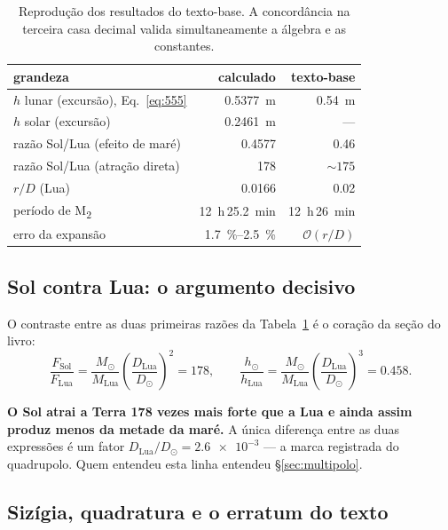 \documentclass[11pt,a4paper,oneside]{report}
\theoremstyle{definition}
\theoremstyle{plain}
\theoremstyle{remark}
\newcommand{\ordem}[1]{\mathcal{O}\!\left(#1\right)}
\begin{document}
\begin{table}[htbp]
\centering
\caption{Reprodução dos resultados do texto-base. A concordância na terceira
casa decimal valida simultaneamente a álgebra e as constantes.}
\label{tab:numeros}
\begin{tabular}{@{}lrr@{}}
\toprule
grandeza & calculado & texto-base \\
\midrule
$h$ lunar (excursão), Eq.~\eqref{eq:555} & \SI{0.5377}{\meter} & \SI{0.54}{\meter} \\
$h$ solar (excursão) & \SI{0.2461}{\meter} & --- \\
razão Sol/Lua (efeito de maré) & \num{0.4577} & \num{0.46} \\
razão Sol/Lua (atração direta) & \num{178} & $\sim\!\num{175}$ \\
$r/D$ (Lua) & \num{0.0166} & \num{0.02} \\
período de M\textsubscript{2} & \SI{12}{\hour}\,\SI{25.2}{\minute} & \SI{12}{\hour}\,\SI{26}{\minute} \\
erro da expansão & \SIrange{1.7}{2.5}{\percent} & $\ordem{r/D}$ \\
\bottomrule
\end{tabular}
\end{table}

\subsection{Sol contra Lua: o argumento decisivo}
\label{sec:solvslua}

O contraste entre as duas primeiras razões da Tabela~\ref{tab:numeros} é o
coração da seção do livro:
\begin{equation}
\frac{F_{\text{Sol}}}{F_{\text{Lua}}}
=\frac{M_\odot}{M_{\text{Lua}}}\left(\frac{D_{\text{Lua}}}{D_\odot}\right)^{2}
=\num{178},
\qquad
\frac{h_\odot}{h_{\text{Lua}}}
=\frac{M_\odot}{M_{\text{Lua}}}\left(\frac{D_{\text{Lua}}}{D_\odot}\right)^{3}
=\num{0.458}.
\end{equation}

\textbf{O Sol atrai a Terra 178 vezes mais forte que a Lua e ainda assim produz
menos da metade da maré.} A única diferença entre as duas expressões é um fator
$D_{\text{Lua}}/D_\odot=\num{2.6e-3}$ — a marca registrada do quadrupolo. Quem
entendeu esta linha entendeu \S\ref{sec:multipolo}.

\subsection{Sizígia, quadratura e o erratum do texto}
\end{document}
